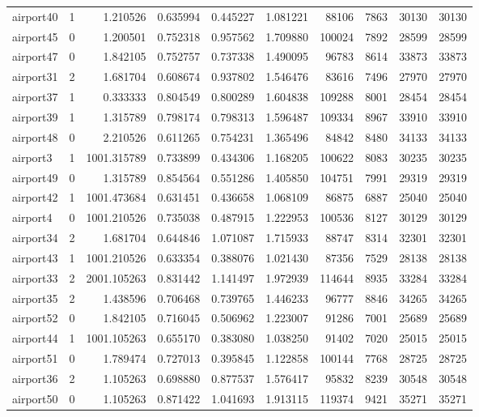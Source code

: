 \begin{longtable}{|l|r|r|r|r|r|r|r|r|r|}
airport40 & 1 & 1.210526 & 0.635994 & 0.445227 & 1.081221 & 88106 & 7863 & 30130 & 30130 \\
airport45 & 0 & 1.200501 & 0.752318 & 0.957562 & 1.709880 & 100024 & 7892 & 28599 & 28599 \\
airport47 & 0 & 1.842105 & 0.752757 & 0.737338 & 1.490095 & 96783 & 8614 & 33873 & 33873 \\
airport31 & 2 & 1.681704 & 0.608674 & 0.937802 & 1.546476 & 83616 & 7496 & 27970 & 27970 \\
airport37 & 1 & 0.333333 & 0.804549 & 0.800289 & 1.604838 & 109288 & 8001 & 28454 & 28454 \\
airport39 & 1 & 1.315789 & 0.798174 & 0.798313 & 1.596487 & 109334 & 8967 & 33910 & 33910 \\
airport48 & 0 & 2.210526 & 0.611265 & 0.754231 & 1.365496 & 84842 & 8480 & 34133 & 34133 \\
airport3 & 1 & 1001.315789 & 0.733899 & 0.434306 & 1.168205 & 100622 & 8083 & 30235 & 30235 \\
airport49 & 0 & 1.315789 & 0.854564 & 0.551286 & 1.405850 & 104751 & 7991 & 29319 & 29319 \\
airport42 & 1 & 1001.473684 & 0.631451 & 0.436658 & 1.068109 & 86875 & 6887 & 25040 & 25040 \\
airport4 & 0 & 1001.210526 & 0.735038 & 0.487915 & 1.222953 & 100536 & 8127 & 30129 & 30129 \\
airport34 & 2 & 1.681704 & 0.644846 & 1.071087 & 1.715933 & 88747 & 8314 & 32301 & 32301 \\
airport43 & 1 & 1001.210526 & 0.633354 & 0.388076 & 1.021430 & 87356 & 7529 & 28138 & 28138 \\
airport33 & 2 & 2001.105263 & 0.831442 & 1.141497 & 1.972939 & 114644 & 8935 & 33284 & 33284 \\
airport35 & 2 & 1.438596 & 0.706468 & 0.739765 & 1.446233 & 96777 & 8846 & 34265 & 34265 \\
airport52 & 0 & 1.842105 & 0.716045 & 0.506962 & 1.223007 & 91286 & 7001 & 25689 & 25689 \\
airport44 & 1 & 1001.105263 & 0.655170 & 0.383080 & 1.038250 & 91402 & 7020 & 25015 & 25015 \\
airport51 & 0 & 1.789474 & 0.727013 & 0.395845 & 1.122858 & 100144 & 7768 & 28725 & 28725 \\
airport36 & 2 & 1.105263 & 0.698880 & 0.877537 & 1.576417 & 95832 & 8239 & 30548 & 30548 \\
airport50 & 0 & 1.105263 & 0.871422 & 1.041693 & 1.913115 & 119374 & 9421 & 35271 & 35271 \\

\end{longtable}
